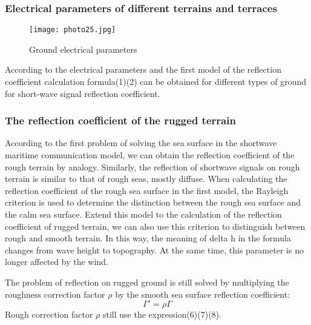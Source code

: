 \documentclass{mcmthesis}
\begin{document}
\subsubsection{Electrical parameters of different terrains and terraces}%
\begin{figure}[h]
\small
\centering
\texttt{[image: photo25.jpg]}
\caption{Ground electrical parameters} \label{fig:aa}
\end{figure}
According to the electrical parameters and the first model of the reflection coefficient calculation formula(1)(2) can be obtained for different types of ground for short-wave signal reflection coefficient.
\subsubsection{The reflection coefficient of the rugged terrain}%
According to the first problem of solving the sea surface in the shortwave maritime communication model, we can obtain the reflection coefficient of the rough terrain by analogy. Similarly, the reflection of shortwave signals on rough terrain is similar to that of rough seas, mostly diffuse. When calculating the reflection coefficient of the rough sea surface in the first model, the Rayleigh criterion is used to determine the distinction between the rough sea surface and the calm sea surface. Extend this model to the calculation of the reflection coefficient of rugged terrain, we can also use this criterion to distinguish between rough and smooth terrain. In this way, the meaning of delta h in the formula changes from wave height to topography. At the same time, this parameter is no longer affected by the wind.

The problem of reflection on rugged ground is still solved by multiplying the roughness correction factor $\rho$ by the smooth sea surface reflection coefficient:
\begin{equation}
\Gamma'=\rho\Gamma
\end{equation}
Rough correction factor $\rho$ still use the expression(6)(7)(8).
\end{document}
